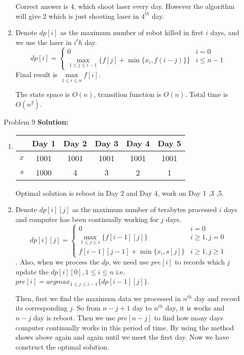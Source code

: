 \normalfont\documentclass[letterpaper,11pt]{article}
\begin{document}
\begin{enumerate}
\begin{enumerate}
\begin{tabular}{|c|c|c|c|c|}
			\hline
		\end{tabular}\par
		Correct answer is $4$, which shoot laser every day. However the algorithm will give $2$ which is just shooting laser in $4^{th}$ day.
	\item
	Denote $dp[i]$ as the maximum number of robot killed in first $i$ days, and we use the laser in $i^th$ day.\\
	$$ dp[i]=\left\{
		\begin{array}{ll}
		0   &    i = 0\\
		\max \limits_{1\le j \le i - 1} \{f[j] + \min\{x_i, f(i - j)\}\} &           i \le n - 1
		\end{array} \right. 
	$$
	Final result is $\max \limits_{1\le i \le n}f[i]$.\par
	The state space is $O(n)$, transition function is $O(n)$. Total time is $O(n^2)$.
\end{enumerate}
\item [Problem 9]\textbf{Solution:}\par
\begin{enumerate}
	\item
	\begin{tabular}{cccccc}
			\hline
			& Day 1&Day 2 &Day 3 &Day 4& Day 5 \\
			\hline
			$x$ & 1001 & 1001 & 1001 & 1001 & 1001 \\
			\hline
			$s$ & 1000 & 4 & 3 & 2 & 1 \\
			\hline
	\end{tabular}\par
	Optimal solution is reboot in Day 2 and Day 4, work on Day 1 ,3 ,5.\par
	\item
	Denote $dp[i][j]$ as the maximum number of terabytes processed $i$ days and computer has been continually working for $j$ days. 
	$$ dp[i][j]=\left\{
		\begin{array}{ll}
		0   &    i = 0\\
		\max \limits_{1\le j \le i} \{f[i-1][j]\} & i \ge 1, j = 0\\
		f[i-1][j-1] + \min\{x_i, s[j]\} &           i \ge 1, j \ge 1
		\end{array} \right. 
	$$.
	Also, when we process the $dp$, we need use $pre[i]$ to records which $j$ update the $dp[i][0], 1 \le i \le n$ i.e. $pre[i] = argmax_{1\le j \le i-1}\{dp[i-1][j]\}$.\par
	Then, first we find the maximum data we processed in $n^{th}$ day and record its corresponding $j$. So from $n - j + 1$ day to $n^{th}$ day, it is works and $n - j$ day is reboot. Then we use $pre[n - j]$ to find how many days computer continually works in this period of time. By using the method shows above again and again until we meet the first day. Now we have construct the optimal solution.

\end{enumerate}
\end{enumerate}
\end{document}

